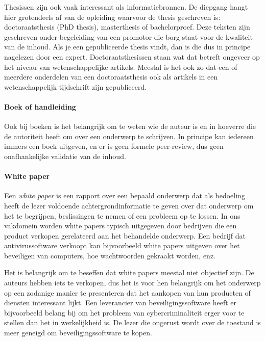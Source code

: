 Thesissen zijn ook vaak interessant als informatiebronnen. De diepgang hangt hier grotendeels af van de opleiding waarvoor de thesis geschreven is: doctoraatsthesis (PhD thesis), masterthesis of bachelorproef. Deze teksten zijn geschreven onder begeleiding van een promotor die borg staat voor de kwaliteit van de inhoud. Als je een gepubliceerde thesis vindt, dan is die dus in principe nagelezen door een expert. Doctoraatsthesissen staan wat dat betreft ongeveer op het niveau van wetenschappelijke artikels. Meestal is het ook zo dat een of meerdere onderdelen van een doctoraatsthesis ook als artikels in een wetenschappelijk tijdschrift zijn gepubliceerd.

\paragraph{Boek of handleiding}

Ook bij boeken is het belangrijk om te weten wie de auteur is en in hoeverre die de autoriteit heeft om over een onderwerp te schrijven. In principe kan iedereen immers een boek uitgeven, en er is geen formele peer-review, dus geen onafhankelijke validatie van de inhoud.


\paragraph{White paper}

Een \emph{white paper} is een rapport over een bepaald onderwerp dat als bedoeling heeft de lezer voldoende achtergrondinformatie te geven over dat onderwerp om het te begrijpen, beslissingen te nemen of een probleem op te lossen. In ons vakdomein worden white papers typisch uitgegeven door bedrijven die een product verkopen gerelateerd aan het behandelde onderwerp. Een bedrijf dat antivirussoftware verkoopt kan bijvoorbeeld white papers uitgeven over het beveiligen van computers, hoe wachtwoorden gekraakt worden, enz.

Het is belangrijk om te beseffen dat white papers meestal niet objectief zijn. De auteurs hebben iets te verkopen, dus het is voor hen belangrijk om het onderwerp op een zodanige manier te presenteren dat het aankopen van hun producten of diensten interessant lijkt. Een leverancier van beveiligingssoftware heeft er bijvoorbeeld belang bij om het probleem van cybercriminaliteit erger voor te stellen dan het in werkelijkheid is. De lezer die ongerust wordt over de toestand is meer geneigd om beveiligingssoftware te kopen.

